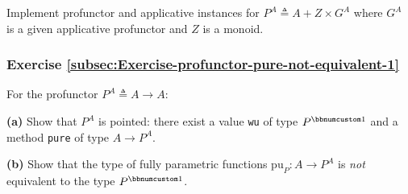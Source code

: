 Implement profunctor and applicative instances for $P^{A}\triangleq A+Z\times G^{A}$
where $G^{A}$ is a given applicative profunctor and $Z$ is a monoid.

\subsubsection{Exercise \label{subsec:Exercise-profunctor-pure-not-equivalent-1}\ref{subsec:Exercise-profunctor-pure-not-equivalent-1}}

For the profunctor $P^{A}\triangleq A\rightarrow A$:

\textbf{(a)} Show that $P^{A}$ is pointed: there exist a value \lstinline!wu!
of type $P^{\bbnum 1}$ and a method \lstinline!pure! of type $A\rightarrow P^{A}$. 

\textbf{(b)} Show that the type of fully parametric functions $\text{pu}_{P}:A\rightarrow P^{A}$
is \emph{not} equivalent to the type $P^{\bbnum 1}$.

